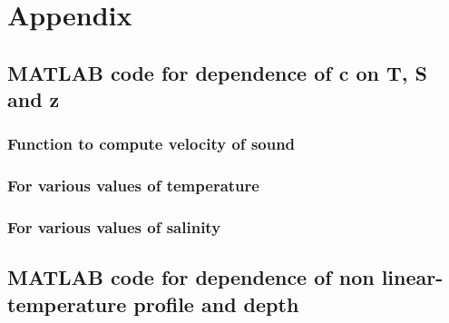 
\chapter{Appendix} \label{Appendix}

\section{ MATLAB code for dependence of c on T, S and z } \label{MATLAB code for dependence of c on T, S and z }


\subsection{Function to compute velocity of sound} \label{Function to compute velocity of sound} 



\subsection{For various values of temperature} \label{For various values of temperature} 


\subsection{For various values of salinity} \label{For various values of salinity} 


\section{ MATLAB code for dependence of non linear-temperature profile and depth} \label{ MATLAB code for dependence of non-linear temperature profile and depth}

